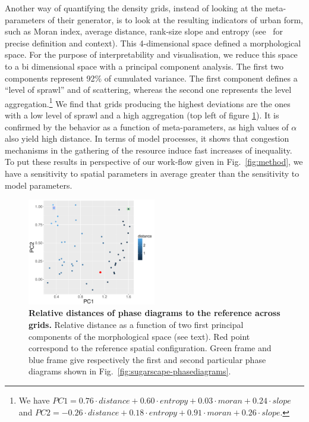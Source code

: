 \documentclass[Afour,sageh,times]{sagej}
\begin{document}
Another way of quantifying the density grids, instead of looking at the meta-parameters of their generator, is to look at the resulting indicators of urban form, such as Moran index, average distance, rank-size slope and entropy (see~\cite{LeNechet2015} for precise definition and context). This 4-dimensional space defined a morphological space. For the purpose of interpretability and visualisation, we reduce this space to a bi dimensional space with a principal component analysis. The first two components represent 92\% of cumulated variance. The first component defines a ``level of sprawl'' and of scattering, whereas the second one represents the level aggregation.\footnote{We have $PC1 = 0.76\cdot distance + 0.60\cdot entropy + 0.03\cdot moran + 0.24\cdot slope$ and $PC2 = -0.26\cdot distance + 0.18\cdot entropy + 0.91\cdot moran + 0.26\cdot slope$.} We find that grids producing the highest deviations are the ones with a low level of sprawl and a high aggregation (top left of figure \ref{fig:sugarscape-distance-pca}). It is confirmed by the behavior as a function of meta-parameters, as high values of $\alpha$ also yield high distance. In terms of model processes, it shows that congestion mechanisms in the gathering of the resource induce fast increases of inequality. To put these results in perspective of our work-flow given in Fig.~\ref{fig:method}, we have a sensitivity to spatial parameters in average greater than the sensitivity to model parameters.



\begin{figure}
\centering
\includegraphics[width=0.5\textwidth]{figures/relativedistance_morphspace}
\caption{\textbf{Relative distances of phase diagrams to the reference across grids.} Relative distance as a function of two first principal components of the morphological space (see text). Red point correspond to the reference spatial configuration. Green frame and blue frame give respectively the first and second particular phase diagrams shown in Fig.~\ref{fig:sugarscape-phasediagrams}.}
\label{fig:sugarscape-distance-pca}
\end{figure}
\end{document}
